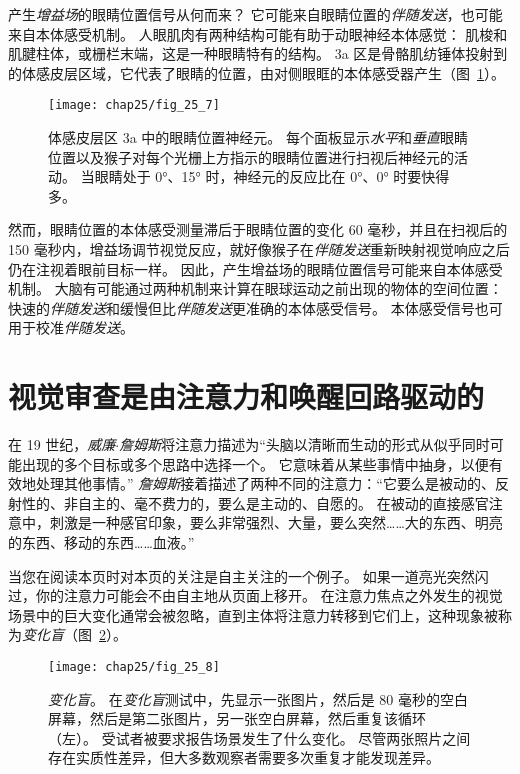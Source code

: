 产生\textit{增益场}的眼睛位置信号从何而来？
它可能来自眼睛位置的\textit{伴随发送}，也可能来自本体感受机制。
人眼肌肉有两种结构可能有助于动眼神经本体感觉：
肌梭和肌腱柱体，或栅栏末端，这是一种眼睛特有的结构。
3a 区是骨骼肌纺锤体投射到的体感皮层区域，它代表了眼睛的位置，由对侧眼眶的本体感受器产生（图~\ref{fig:25_7}）。


\begin{figure}[htbp]
	\centering
	\texttt{[image: chap25/fig\_25\_7]}
	\caption{体感皮层区 3a 中的眼睛位置神经元。
		每个面板显示\textit{水平}和\textit{垂直}眼睛位置以及猴子对每个光栅上方指示的眼睛位置进行扫视后神经元的活动。
		当眼睛处于 0°、15° 时，神经元的反应比在 0°、0° 时要快得多。}
	\label{fig:25_7}
\end{figure}


然而，眼睛位置的本体感受测量滞后于眼睛位置的变化 60 毫秒，并且在扫视后的 150 毫秒内，增益场调节视觉反应，就好像猴子在\textit{伴随发送}重新映射视觉响应之后仍在注视着眼前目标一样。
因此，产生增益场的眼睛位置信号可能来自本体感受机制。
大脑有可能通过两种机制来计算在眼球运动之前出现的物体的空间位置：
快速的\textit{伴随发送}和缓慢但比\textit{伴随发送}更准确的本体感受信号。
本体感受信号也可用于校准\textit{伴随发送}。



\section{视觉审查是由注意力和唤醒回路驱动的}

在 19 世纪，\textit{威廉$\cdot$詹姆斯}将注意力描述为“头脑以清晰而生动的形式从似乎同时可能出现的多个目标或多个思路中选择一个。
它意味着从某些事情中抽身，以便有效地处理其他事情。” 
\textit{詹姆斯}接着描述了两种不同的注意力：“它要么是被动的、反射性的、非自主的、毫不费力的，要么是主动的、自愿的。
在被动的直接感官注意中，刺激是一种感官印象，要么非常强烈、大量，要么突然……大的东西、明亮的东西、移动的东西……血液。”


当您在阅读本页时对本页的关注是自主关注的一个例子。
如果一道亮光突然闪过，你的注意力可能会不由自主地从页面上移开。
在注意力焦点之外发生的视觉场景中的巨大变化通常会被忽略，直到主体将注意力转移到它们上，这种现象被称为\textit{变化盲}（图~\ref{fig:25_8}）。


\begin{figure}[htbp]
	\centering
	\texttt{[image: chap25/fig\_25\_8]}
	\caption{\textit{变化盲}。
		在\textit{变化盲}测试中，先显示一张图片，然后是 80 毫秒的空白屏幕，然后是第二张图片，另一张空白屏幕，然后重复该循环（左）。
		受试者被要求报告场景发生了什么变化。
		尽管两张照片之间存在实质性差异，但大多数观察者需要多次重复才能发现差异。}
	\label{fig:25_8}
\end{figure}


